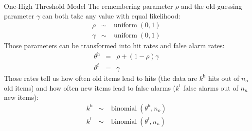 \documentclass[10pt]{beamer}
\begin{document}
\begin{frame}[fragile]{One-High Threshold Model}
	The remembering parameter $\rho$ and the old-guessing parameter $\gamma$ can both take any value with equal likelihood:
	\begin{eqnarray}
		\rho &\sim& \operatorname{uniform}\left(0, 1\right) \nonumber\\
		\gamma &\sim&\operatorname{uniform}\left(0, 1\right) \nonumber
	\end{eqnarray}\pause
	Those parameters can be transformed into hit rates and false alarm rates:
	\begin{eqnarray}
		\theta^\mathrm{h} &=& {\rho} + {\left(1-\rho\right)\gamma} \nonumber\\
		\theta^\mathrm{f} &=& {\gamma} \nonumber
	\end{eqnarray}\pause
	Those rates tell us how often old items lead to hits (the data are $k^\mathrm{h}$ hits out of $n_o$ old items) and how often new items lead to false alarms ($k^\mathrm{f}$ false alarms out of $n_n$ new items):
	\begin{eqnarray}
		k^\mathrm{h} &\sim& \operatorname{binomial}\left(\theta^\mathrm{h}, n_o\right) \nonumber\\
		k^\mathrm{f} &\sim& \operatorname{binomial}\left(\theta^\mathrm{f}, n_n\right) \nonumber
	\end{eqnarray}

\end{frame}
\end{document}
